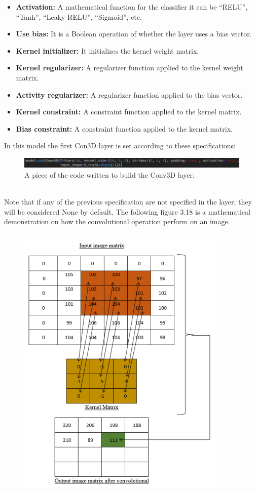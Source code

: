 \begin{itemize}
\begin{itemize}
        \item \textbf{Activation:} A mathematical function for the classifier it can be “RELU”, “Tanh”, “Leaky RELU”, “Sigmoid”, etc.
        \item \textbf{Use bias:} It is a Boolean operation of whether the layer uses a bias vector.
        \item \textbf{Kernel initializer:} It initializes the kernel weight matrix.
        \item \textbf{Kernel regularizer:} A regularizer function applied to the kernel weight matrix.
        \item \textbf{Activity regularizer:} A regularizer function applied to the bias vector.
        \item \textbf{Kernel constraint:} A constraint function applied to the kernel matrix.
        \item \textbf{Bias constraint:} A constraint function applied to the kernel matrix.
    \end{itemize}
    \newpage
    In this model the first Con3D layer is set according to these specifications:
    \begin{figure}[ht]
    \centering
    \includegraphics{Figures/c31}
    \decoRule
    \caption[A piece of the code written to build the Conv3D layer.]{A piece of the code written to build the Conv3D layer.}
    \label{fig:la}
    \end{figure}\hfill \\
    Note that if any of the previous specification are not specified in the layer, they will be considered None by default.
    The following figure 3.18 is a mathematical demonstration on how the convolutional operation perform on an image. 
    \begin{figure}[ht]
    \centering
    \includegraphics{Figures/matrix1}

\end{figure}
\end{itemize}

